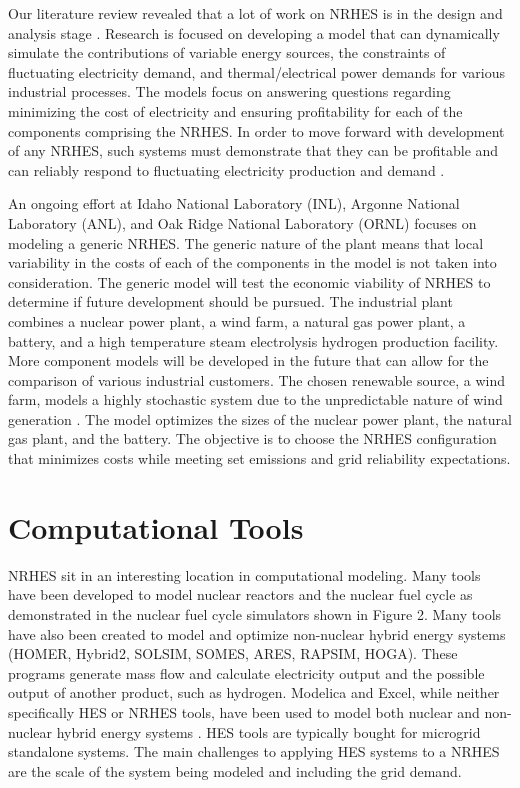 \documentclass[12pt]{UIdahoMastersThesis}
\begin{document}
Our literature review revealed that a lot of work on NRHES is in the design and analysis stage \cite{Boardman2013, Shropshire2012}. Research is focused on developing a model that can dynamically simulate the contributions of variable energy sources, the constraints of fluctuating electricity demand, and thermal/electrical power demands for various industrial processes. The models focus on answering questions regarding minimizing the cost of electricity and ensuring profitability for each of the components comprising the NRHES. In order to move forward with development of any NRHES,  such systems must demonstrate that they can be profitable and can reliably respond to fluctuating electricity production and demand \cite{Rabiti2015}.

An ongoing effort at Idaho National Laboratory (INL), Argonne National Laboratory (ANL), and Oak Ridge National Laboratory (ORNL) focuses on modeling a generic NRHES. The generic nature of the plant means that local variability in the costs of each of the components in the model is not taken into consideration. The generic model will test the economic viability of NRHES to determine if future development should be pursued. The industrial plant combines a nuclear power plant, a wind farm, a natural gas power plant, a battery, and a high temperature steam electrolysis hydrogen production facility. More component models will be developed in the future that can allow for the comparison of various industrial customers\cite{Harrison2016}. The chosen renewable source, a wind farm, models a highly stochastic system due to the unpredictable nature of wind generation \cite{Chen2016_wind}. The model optimizes the sizes of the nuclear power plant, the natural gas plant, and the battery. The objective is to choose the NRHES configuration that minimizes costs while meeting set emissions and grid reliability expectations.

\section{Computational Tools}
NRHES sit in an interesting location in computational modeling. Many tools have been developed to model nuclear reactors and the nuclear fuel cycle as demonstrated in the nuclear fuel cycle simulators shown in Figure 2. Many tools have also been created to model and optimize non-nuclear hybrid energy systems (HOMER, Hybrid2, SOLSIM, SOMES, ARES, RAPSIM, HOGA)\cite {Bernal-Agustin2009}. These programs generate mass flow and calculate electricity output and the possible output of another product, such as hydrogen. Modelica and Excel, while neither specifically HES or NRHES tools, have been used to model both nuclear and non-nuclear hybrid energy systems \cite{Shropshire2012, Chen2016, Binder2014, Garcia2015, Epiney2016}. HES tools are typically bought for microgrid standalone systems. The main challenges to applying HES systems to a NRHES are the scale of the system being modeled and including the grid demand.
\end{document}

